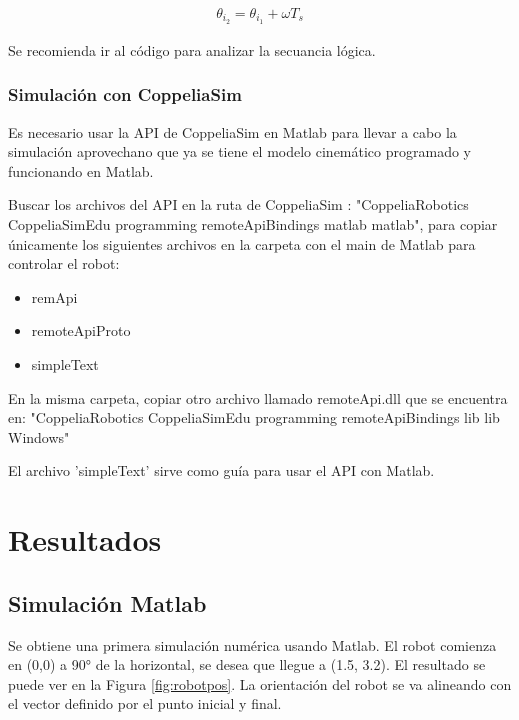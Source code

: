\documentclass[conference]{IEEEtran}
\begin{document}
\begin{gather}\label{newt}
  \theta_{i_{2}} = \theta_{i_{1}} + \omega T_{s}
\end{gather}

Se recomienda ir al código para analizar la secuancia lógica.


\subsubsection{Simulación con CoppeliaSim}
Es necesario usar la API de CoppeliaSim en Matlab para llevar a cabo la simulación
aprovechano que ya se tiene el modelo cinemático programado y funcionando en Matlab.

Buscar los archivos del API en la ruta de CoppeliaSim :
"CoppeliaRobotics CoppeliaSimEdu programming remoteApiBindings matlab matlab",
para copiar únicamente los siguientes archivos en la carpeta con el main de Matlab para controlar el robot:
\begin{itemize}
  \item remApi
  \item remoteApiProto
  \item simpleText
\end{itemize}

En la misma carpeta, copiar otro archivo llamado remoteApi.dll que se encuentra en:
"CoppeliaRobotics CoppeliaSimEdu programming remoteApiBindings lib lib Windows"

El archivo 'simpleText' sirve como guía para usar el API con Matlab.

\section{Resultados}
\subsection{Simulación Matlab}
Se obtiene una primera simulación numérica usando Matlab.
El robot comienza en (0,0) a 90° de la horizontal, se desea que llegue a (1.5, 3.2).
El resultado se puede ver en la Figura \ref{fig:robotpos}. La orientación del robot
se va alineando con el vector definido por el punto inicial y final.
\end{document}
